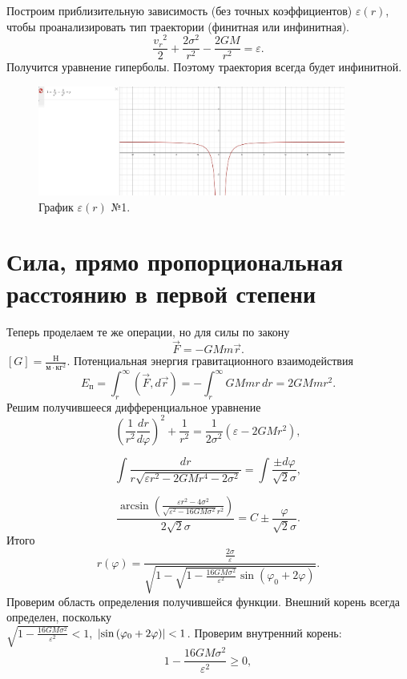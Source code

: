 \documentclass[a4paper]{article}
\begin{document}
Построим приблизительную зависимость (без точных коэффициентов) $\varepsilon(r)$, чтобы проанализировать тип траектории (финитная или инфинитная).
\[
\frac{{v_{r}}^2}{2} + \frac{2\sigma^2}{r^2} - \frac{2GM}{r^2} = \varepsilon.
\]
Получится уравнение гиперболы. Поэтому траектория всегда будет инфинитной.
\begin{figure}[h]
    \centering
    \includegraphics[width=0.9\textwidth]{Finit1.jpg}
    \caption{График $\varepsilon(r) $ №1.}
\end{figure}

\section{Сила, прямо пропорциональная расстоянию в первой степени}
Теперь проделаем те же операции, но для силы по закону 
\[
\vec{F} = -GMm \vec{r}.
\]
 $[G] = \frac{\text{Н}}{\text{м} \cdot \text{кг}^2}$.
Потенциальная энергия гравитационного взаимодействия
\[
E_{\text{п}} = \int_{r}^{\infty}{(\vec{F} , d\vec{r})} = -\int_{r}^{\infty}{GMmr \, dr} = 2GMm r^2.
\]
Решим получившееся дифференциальное уравнение
\[
(\frac{1}{r^2}\frac{dr}{d\varphi})^2 + \frac{1}{r^2} = \frac{1}{2\sigma^2}(\varepsilon - 2GMr^2),
\]

\[
\int{\frac{dr}{r\sqrt{\varepsilon r^2 - 2GMr^4 - 2\sigma^2}}} = \int{\frac{\pm d\varphi}{\sqrt{2}\sigma}},
\]

\[
\frac{\arcsin{(\frac{\varepsilon r^2 - 4\sigma^2}{\sqrt{\varepsilon^2-16GM\sigma^2} r^2})}}{2\sqrt{2}\sigma} = C \pm \frac{\varphi} {\sqrt{2}\sigma}.
\]
Итого
\begin{equation} \tag{6}
r(\varphi) = \frac{\frac{2\sigma}{\varepsilon}}{\sqrt{1-\sqrt{1-\frac{16GM\sigma^2}{\varepsilon^2}}\sin{(\varphi_0 + 2\varphi)}}}.
\end{equation}
Проверим область определения получившейся функции. Внешний корень всегда определен, поскольку 
\\$\sqrt{1-\frac{16GM\sigma^2}{\varepsilon^2}}< 1$, $\abs{\sin{(\varphi_0 + 2\varphi)}} < 1$. Проверим внутренний корень:
\[
1-\frac{16GM\sigma^2}{\varepsilon^2}  \geqslant 0,
\]
\end{document}
